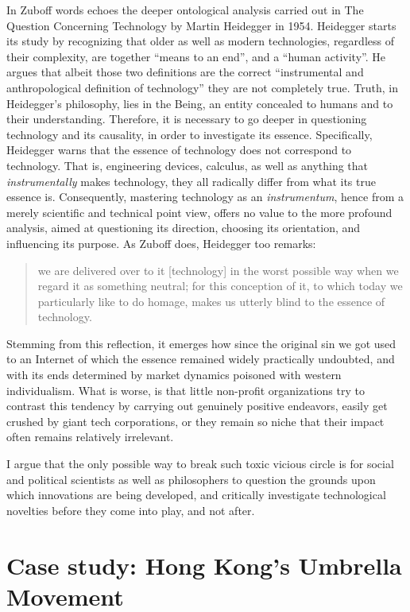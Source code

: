 \documentclass[
  a4paper,
]{book}
\begin{document}
In Zuboff words echoes the deeper ontological analysis carried out in The Question Concerning Technology by Martin Heidegger in 1954. Heidegger starts its study by recognizing that older as well as modern technologies, regardless of their complexity, are together ``means to an end'', and a ``human activity''. He argues that albeit those two definitions are the correct ``instrumental and anthropological definition of technology'' they are not completely true. Truth, in Heidegger's philosophy, lies in the Being, an entity concealed to humans and to their understanding. Therefore, it is necessary to go deeper in questioning technology and its causality, in order to investigate its essence. Specifically, Heidegger warns that the essence of technology does not correspond to technology. That is, engineering devices, calculus, as well as anything that \emph{instrumentally} makes technology, they all radically differ from what its true essence is. Consequently, mastering technology as an \emph{instrumentum}, hence from a merely scientific and technical point view, offers no value to the more profound analysis, aimed at questioning its direction, choosing its orientation, and influencing its purpose. As Zuboff does, Heidegger too remarks:

\begin{quote}
we are delivered over to it {[}technology{]} in the worst possible way when we regard it as something neutral; for this conception of it, to which today we particularly like to do homage, makes us utterly blind to the essence of technology.
\end{quote}

Stemming from this reflection, it emerges how since the original sin we got used to an Internet of which the essence remained widely practically undoubted, and with its ends determined by market dynamics poisoned with western individualism. What is worse, is that little non-profit organizations try to contrast this tendency by carrying out genuinely positive endeavors, easily get crushed by giant tech corporations, or they remain so niche that their impact often remains relatively irrelevant.

I argue that the only possible way to break such toxic vicious circle is for social and political scientists as well as philosophers to question the grounds upon which innovations are being developed, and critically investigate technological novelties before they come into play, and not after.

\hypertarget{case-study-hong-kongs-umbrella-movement}{%
\chapter{Case study: Hong Kong's Umbrella Movement}\label{case-study-hong-kongs-umbrella-movement}}
\end{document}
